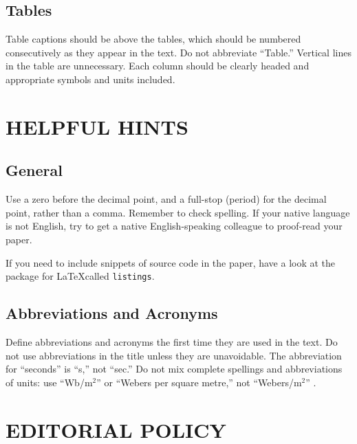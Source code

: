 \documentclass[10pt,twocolumn]{witseiepaper}
\begin{document}
\subsection{Tables}

Table captions should be above the tables, which should be numbered
consecutively as they appear in the text. Do not abbreviate ``Table.'' Vertical
lines in the table are unnecessary. Each column should be clearly headed and
appropriate symbols and units included.


%
\section{HELPFUL HINTS}

\subsection{General}

Use a zero before the decimal point, and a full-stop (period) for the decimal
point, rather than a comma.  Remember to check spelling. If your native
language is not English, try to get a native English-speaking colleague to
proof-read your paper.

If you need to include snippets of source code in the paper, have a look at the
package for \LaTeX called \verb|listings|.

\subsection{Abbreviations and Acronyms}

Define abbreviations and acronyms the first time they are used in the text. Do
not use abbreviations in the title unless they are unavoidable. The
abbreviation for ``seconds'' is ``s,'' not ``sec.'' Do not mix complete
spellings and abbreviations of units: use ``Wb/m$^2$'' or ``Webers per square
metre,'' not ``Webers/m$^2$'' .

\balance

%
\section{EDITORIAL POLICY}
\end{document}
